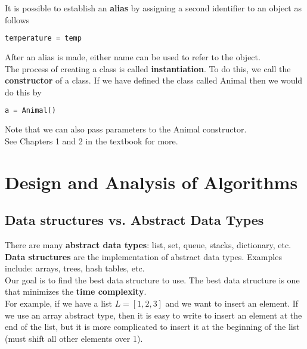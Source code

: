 \documentclass[]{article}
\begin{document}
It is possible to establish an \textbf{alias} by assigning a second identifier to an object as follows

\begin{lstlisting}[language=Python]
	temperature = temp
\end{lstlisting}

After an alias is made, either name can be used to refer to the object.\\

The process of creating a class is called \textbf{instantiation}. To do this, we call the \textbf{constructor} of a class. If we have defined the class called Animal then we would do this by

\begin{lstlisting}[language=Python]
	a = Animal()
\end{lstlisting}

Note that we can also pass parameters to the Animal constructor.\\

See Chapters 1 and 2 in the textbook for more.\\


\section{Design and Analysis of Algorithms}
\bigbreak

\subsection{Data structures vs. Abstract Data Types}

There are many \textbf{abstract data types}: list, set, queue, stacks, dictionary, etc.\\

\textbf{Data structures} are the implementation of abstract data types. Examples include: arrays, trees, hash tables, etc.\\

Our goal is to find the best data structure to use. The best data structure is one that minimizes the \textbf{time complexity}. \\

For example, if we have a list $L = [1, 2, 3]$ and we want to insert an element. If we use an array abstract type, then it is easy to write to insert an element at the end of the list, but it is more complicated to insert it at the beginning of the list (must shift all other elements over 1).\\
\end{document}
